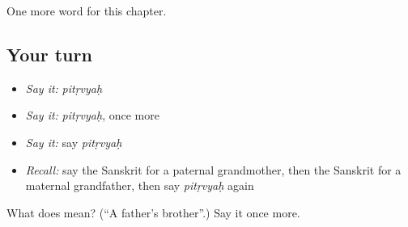\begin{grammarlens}[title={What you've built}]
One more word for this chapter.
\end{grammarlens}

\subsection*{Your turn}
\begin{itemize}
\raggedright
  \item \emph{Say it:} \emph{pitṛvyaḥ}
  \item \emph{Say it:} \emph{pitṛvyaḥ}, once more
  \item \emph{Say it:} say \emph{pitṛvyaḥ}
  \item \emph{Recall:} say the Sanskrit for a paternal grandmother, then the Sanskrit for a maternal grandfather, then say \emph{pitṛvyaḥ} again
\end{itemize}

\begin{tcolorbox}[breakable,colback=teal!4,colframe=teal!35!black,title={Before you move on}]
What does  mean? (\textquotedblleft{}A father's brother\textquotedblright{}.) Say it once more.
\end{tcolorbox}
